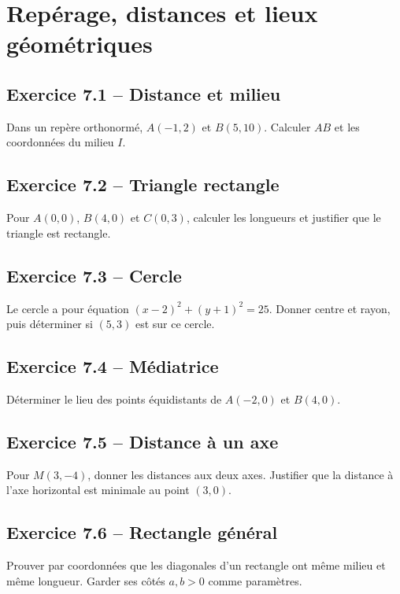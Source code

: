 \chapter{Repérage, distances et lieux géométriques}
\section*{Exercice 7.1 -- Distance et milieu}
Dans un repère orthonormé, $A(-1,2)$ et $B(5,10)$. Calculer $AB$ et les coordonnées du milieu $I$.

\section*{Exercice 7.2 -- Triangle rectangle}
Pour $A(0,0)$, $B(4,0)$ et $C(0,3)$, calculer les longueurs et justifier que le triangle est rectangle.

\section*{Exercice 7.3 -- Cercle}
Le cercle a pour équation $(x-2)^2+(y+1)^2=25$. Donner centre et rayon, puis déterminer si $(5,3)$ est sur ce cercle.

\section*{Exercice 7.4 -- Médiatrice}
Déterminer le lieu des points équidistants de $A(-2,0)$ et $B(4,0)$.

\section*{Exercice 7.5 -- Distance à un axe}
Pour $M(3,-4)$, donner les distances aux deux axes. Justifier que la distance à l'axe horizontal est minimale au point $(3,0)$.

\section*{Exercice 7.6 -- Rectangle général}
Prouver par coordonnées que les diagonales d'un rectangle ont même milieu et même longueur. Garder ses côtés $a,b>0$ comme paramètres.
